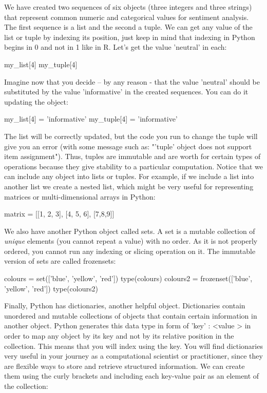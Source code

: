 We have created two sequences of six objects (three integers and three strings) that represent common numeric and categorical values for sentiment analysis. The first sequence is a list and the second a tuple. We can get any value of the list or tuple by indexing its position, just keep in mind that indexing in Python begins in 0 and not in 1 like in R. Let's get the value 'neutral' in each:

\begin{examplepy}
my_list[4]
my_tuple[4]
\end{examplepy}

Imagine now that you decide – by any reason - that the value 'neutral' should be substituted by the value 'informative' in the created sequences. You can do it updating the object:

\begin{examplepy}
my_list[4] = 'informative'
my_tuple[4] = 'informative'
\end{examplepy}

The list will be correctly updated, but the code you run to change the tuple will give you an error (with some message such as: "'tuple' object does not support item assignment"). Thus, tuples are immutable and are worth for certain types of operations because they give stability to a particular computation. Notice that we can include any object into lists or tuples. For example, if we include a list into another list we create a nested list, which might be very useful for representing matrices or multi-dimensional arrays in Python:

\begin{examplepy}
matrix = [[1, 2, 3], [4, 5, 6], [7,8,9]] 
\end{examplepy}	

We also have another Python object called sets. A set is a mutable collection of \emph{unique} elements (you cannot repeat a value) with no order. As it is not properly ordered, you cannot run any indexing or slicing operation on it. The immutable version of sets are called frozensets:

\begin{examplepy}
colours = set(['blue', 'yellow', 'red'])
type(colours)
colours2 = frozenset(['blue', 'yellow', 'red'])
type(colours2)
\end{examplepy}

Finally, Python has dictionaries, another helpful object.	 Dictionaries contain unordered and mutable collections of objects that contain certain information in another object. Python generates this data type in form of { 'key' : \textless value \textgreater} in order to map any object by its key and not by its relative position in the collection. This means that you will index using the key. You will find dictionaries very useful in your journey as a computational scientist or practitioner, since they are flexible ways to store and retrieve structured information. We can create them using the curly brackets {} and including each key-value pair as an element of the collection:

